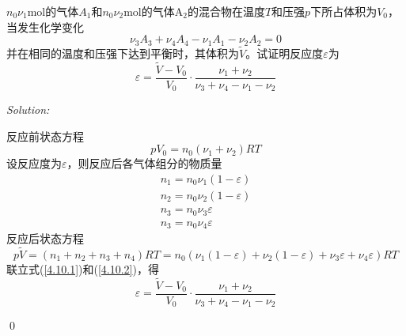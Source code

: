 \documentclass[12pt,a4paper]{article}
\newenvironment{problem}[2][Problem]{\begin{trivlist}
\item[\hskip \labelsep {\bfseries #1}\hskip \labelsep {\bfseries #2.}]}{\end{trivlist}}
\newenvironment{sol}
    {\emph{Solution:}
    }
    {
    \qed
    }
\begin{document}
\begin{problem}{4.10}
$n_0\nu_1$mol的气体$A_1$和$n_0\nu_2$mol的气体A$_2$的混合物在温度$T$和压强$p$下所占体积为$V_0$，当发生化学变化
\[
\nu_3A_3+\nu_4A_4-\nu_1A_1-\nu_2A_2=0
\]
并在相同的温度和压强下达到平衡时，其体积为$\tilde{V}$。试证明反应度$\varepsilon$为
\[
\varepsilon=\frac{\tilde{V}-V_0}{V_0}\cdot\frac{\nu_1+\nu_2}{\nu_3+\nu_4-\nu_1-\nu_2}
\]
\end{problem}
\begin{sol}
反应前状态方程
\begin{equation}
\label{4.10.1}pV_0=n_0(\nu_1+\nu_2)RT
\end{equation}
设反应度为$\varepsilon$，则反应后各气体组分的物质量
\begin{gather}
n_1=n_0\nu_1(1-\varepsilon)\\
n_2=n_0\nu_2(1-\varepsilon)\\
n_3=n_0\nu_3\varepsilon\\
n_3=n_0\nu_4\varepsilon
\end{gather}
反应后状态方程
\begin{equation}
\label{4.10.2}p\tilde{V}=(n_1+n_2+n_3+n_4)RT=n_0(\nu_1(1-\varepsilon)+\nu_2(1-\varepsilon)+\nu_3\varepsilon+\nu_4\varepsilon)RT
\end{equation}
联立式(\ref{4.10.1})和(\ref{4.10.2})，得
\begin{equation}
\varepsilon=\frac{\tilde{V}-V_0}{V_0}\cdot\frac{\nu_1+\nu_2}{\nu_3+\nu_4-\nu_1-\nu_2}
\end{equation}
\end{sol}
\end{document}
